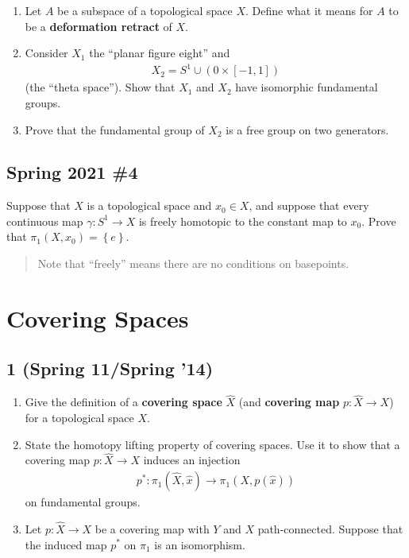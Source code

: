 \begin{enumerate}
\def\labelenumi{\alph{enumi}.}
\item
  Let \(A\) be a subspace of a topological space \(X\). Define what it
  means for \(A\) to be a \textbf{deformation retract} of \(X\).
\item
  Consider \(X_1\) the ``planar figure eight'' and
  \begin{align*}X_2 = S^1 \cup ({0} \times [-1, 1])\end{align*}
  (the ``theta space''). Show that \(X_1\) and \(X_2\) have isomorphic
  fundamental groups.
\item
  Prove that the fundamental group of \(X_2\) is a free group on two
  generators.
\end{enumerate}

\hypertarget{spring-2021-4}{%
\subsection{Spring 2021 \#4}\label{spring-2021-4}}

\begin{problem}[Spring 2021, 4]

Suppose that \(X\) is a topological space and \(x_0\in X\), and suppose
that every continuous map \(\gamma: S^1 \to X\) is freely homotopic to
the constant map to \(x_0\). Prove that
\(\pi_1(X, x_0) = \left\{{ e }\right\}\).

\begin{quote}
Note that ``freely'' means there are no conditions on basepoints.
\end{quote}

\end{problem}

\hypertarget{covering-spaces}{%
\section{Covering Spaces}\label{covering-spaces}}

\hypertarget{spring-11spring-14}{%
\subsection{1 (Spring 11/Spring '14)}\label{spring-11spring-14}}

\begin{enumerate}
\def\labelenumi{\alph{enumi}.}
\item
  Give the definition of a \textbf{covering space} \(\widehat{X}\) (and
  \textbf{covering map} \(p : \widehat{X} \to X\)) for a topological
  space \(X\).
\item
  State the homotopy lifting property of covering spaces. Use it to show
  that a covering map \(p : \widehat{X} \to X\) induces an injection
  \begin{align*}
  p^\ast : \pi_1 (\widehat{X}, \widehat{x}) \to \pi_1 (X, p(\widehat{x}))
  \end{align*}
  on fundamental groups.
\item
  Let \(p : \widehat{X} \to X\) be a covering map with \(Y\) and \(X\)
  path-connected. Suppose that the induced map \(p^\ast\) on \(\pi_1\)
  is an isomorphism.
\end{enumerate}

